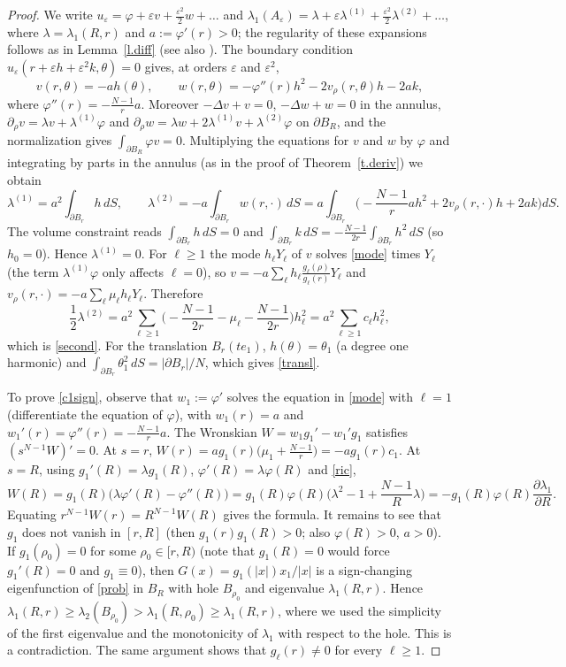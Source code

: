 \documentclass[11pt]{amsart}
\theoremstyle{remark}
\numberwithin{equation}{section}
\begin{document}
\begin{proof}
We write $u_\varepsilon=\varphi+\varepsilon v+\frac{\varepsilon^2}2w+\dots$ and $\lambda_1(A_\varepsilon)=\lambda+\varepsilon\lambda^{(1)}+\frac{\varepsilon^2}2\lambda^{(2)}+\dots$, where $\lambda=\lambda_1(R,r)$ and $a:=\varphi'(r)>0$; the regularity of these expansions follows as in Lemma~\ref{l.diff} (see also \cite[Chapter~5]{HP}). The boundary condition $u_\varepsilon(r+\varepsilon h+\varepsilon^2k,\theta)=0$ gives, at orders $\varepsilon$ and $\varepsilon^2$,
\[
v(r,\theta)=-ah(\theta),\qquad w(r,\theta)=-\varphi''(r)h^2-2v_\rho(r,\theta)h-2ak,
\]
where $\varphi''(r)=-\frac{N-1}ra$. Moreover $-\Delta v+v=0$, $-\Delta w+w=0$ in the annulus, $\partial_\rho v=\lambda v+\lambda^{(1)}\varphi$ and $\partial_\rho w=\lambda w+2\lambda^{(1)}v+\lambda^{(2)}\varphi$ on $\partial B_R$, and the normalization gives $\int_{\partial B_R}\varphi v=0$. Multiplying the equations for $v$ and $w$ by $\varphi$ and integrating by parts in the annulus (as in the proof of Theorem~\ref{t.deriv}) we obtain
\[
\lambda^{(1)}=a^2\int_{\partial B_r}h\,dS,\qquad\lambda^{(2)}=-a\int_{\partial B_r}w(r,\cdot)\,dS=a\int_{\partial B_r}\Big(-\frac{N-1}rah^2+2v_\rho(r,\cdot)h+2ak\Big)dS.
\]
The volume constraint reads $\int_{\partial B_r}h\,dS=0$ and $\int_{\partial B_r}k\,dS=-\frac{N-1}{2r}\int_{\partial B_r}h^2\,dS$ (so $h_0=0$). Hence $\lambda^{(1)}=0$. For $\ell\ge1$ the mode $h_\ell Y_\ell$ of $v$ solves \eqref{mode} times $Y_\ell$ (the term $\lambda^{(1)}\varphi$ only affects $\ell=0$), so $v=-a\sum_\ell h_\ell\frac{g_\ell(\rho)}{g_\ell(r)}Y_\ell$ and $v_\rho(r,\cdot)=-a\sum_\ell\mu_\ell h_\ell Y_\ell$. Therefore
\[
\frac12\lambda^{(2)}=a^2\sum_{\ell\ge1}\Big(-\frac{N-1}{2r}-\mu_\ell-\frac{N-1}{2r}\Big)h_\ell^2=a^2\sum_{\ell\ge1}c_\ell h_\ell^2,
\]
which is \eqref{second}. For the translation $B_r(te_1)$, $h(\theta)=\theta_1$ (a degree one harmonic) and $\int_{\partial B_r}\theta_1^2\,dS=|\partial B_r|/N$, which gives \eqref{transl}.

To prove \eqref{c1sign}, observe that $w_1:=\varphi'$ solves the equation in \eqref{mode} with $\ell=1$ (differentiate the equation of $\varphi$), with $w_1(r)=a$ and $w_1'(r)=\varphi''(r)=-\frac{N-1}ra$. The Wronskian $W=w_1g_1'-w_1'g_1$ satisfies $(s^{N-1}W)'=0$. At $s=r$, $W(r)=ag_1(r)\big(\mu_1+\frac{N-1}r\big)=-ag_1(r)c_1$. At $s=R$, using $g_1'(R)=\lambda g_1(R)$, $\varphi'(R)=\lambda\varphi(R)$ and \eqref{ric},
\[
W(R)=g_1(R)\big(\lambda\varphi'(R)-\varphi''(R)\big)=g_1(R)\varphi(R)\Big(\lambda^2-1+\frac{N-1}R\lambda\Big)=-g_1(R)\varphi(R)\frac{\partial\lambda_1}{\partial R}.
\]
Equating $r^{N-1}W(r)=R^{N-1}W(R)$ gives the formula. It remains to see that $g_1$ does not vanish in $[r,R]$ (then $g_1(r)g_1(R)>0$; also $\varphi(R)>0$, $a>0$). If $g_1(\rho_0)=0$ for some $\rho_0\in[r,R)$ (note that $g_1(R)=0$ would force $g_1'(R)=0$ and $g_1\equiv0$), then $G(x)=g_1(|x|)x_1/|x|$ is a sign-changing eigenfunction of \eqref{prob} in $B_R$ with hole $B_{\rho_0}$ and eigenvalue $\lambda_1(R,r)$. Hence $\lambda_1(R,r)\ge\lambda_2(B_{\rho_0})>\lambda_1(R,\rho_0)\ge\lambda_1(R,r)$, where we used the simplicity of the first eigenvalue and the monotonicity of $\lambda_1$ with respect to the hole. This is a contradiction. The same argument shows that $g_\ell(r)\neq0$ for every $\ell\ge1$.


\end{proof}
\end{document}
